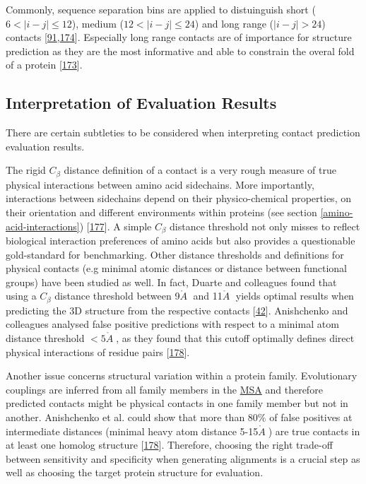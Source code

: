 \documentclass[11pt,a4paper,twoside]{book}
\newcommand{\Cb}{C_\beta}
\newcommand{\angstrom}{\mathring{A} \;}
\theoremstyle{definition}
\theoremstyle{definition}
\theoremstyle{remark}
\begin{document}
Commonly, sequence separation bins are applied to distuinguish short
(\(6 < |i-j| \le 12\)), medium (\(12 < |i-j| \le 24\)) and long range
(\(|i-j| > 24\)) contacts
{[}\protect\hyperlink{ref-Monastyrskyy2015}{91},\protect\hyperlink{ref-Monastyrskyy2014a}{174}{]}.
Especially long range contacts are of importance for structure
prediction as they are the most informative and able to constrain the
overal fold of a protein
{[}\protect\hyperlink{ref-Monastyrskyy2011}{173}{]}.

\subsection{Interpretation of Evaluation
Results}\label{interpretation-of-evaluation-results}

There are certain subtleties to be considered when interpreting contact
prediction evaluation results.

The rigid \(\Cb\) distance definition of a contact is a very rough
measure of true physical interactions between amino acid sidechains.
More importantly, interactions between sidechains depend on their
physico-chemical properties, on their orientation and different
environments within proteins (see section \ref{amino-acid-interactions})
{[}\protect\hyperlink{ref-Bettsa}{177}{]}. A simple \(\Cb\) distance
threshold not only misses to reflect biological interaction preferences
of amino acids but also provides a questionable gold-standard for
benchmarking. Other distance thresholds and definitions for physical
contacts (e.g minimal atomic distances or distance between functional
groups) have been studied as well. In fact, Duarte and colleagues found
that using a \(\Cb\) distance threshold between 9\(\angstrom\) and
11\(\angstrom\) yields optimal results when predicting the 3D structure
from the respective contacts
{[}\protect\hyperlink{ref-Duarte2010}{42}{]}. Anishchenko and colleagues
analysed false positive predictions with respect to a minimal atom
distance threshold \(< 5 \angstrom\), as they found that this cutoff
optimally defines direct physical interactions of residue pairs
{[}\protect\hyperlink{ref-Anishchenko2017}{178}{]}.

Another issue concerns structural variation within a protein family.
Evolutionary couplings are inferred from all family members in the
\protect\hyperlink{abbrev}{MSA} and therefore predicted contacts might
be physical contacts in one family member but not in another.
Anishchenko et al. could show that more than \(80\%\) of false positives
at intermediate distances (minimal heavy atom distance
5-15\(\angstrom\)) are true contacts in at least one homolog structure
{[}\protect\hyperlink{ref-Anishchenko2017}{178}{]}. Therefore, choosing
the right trade-off between sensitivity and specificity when generating
alignments is a crucial step as well as choosing the target protein
structure for evaluation.
\end{document}

